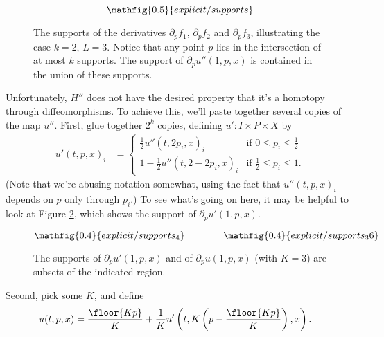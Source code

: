 \begin{figure}[!ht]
\begin{equation*}
\mathfig{0.5}{explicit/supports}
\end{equation*}
\caption{The supports of the derivatives {\color{green}$\partial_p f_1$}, {\color{blue}$\partial_p f_2$} and {\color{red}$\partial_p f_3$}, illustrating the case $k=2$, $L=3$. Notice that any
point $p$ lies in the intersection of at most $k$ supports. The support of $\partial_p u''(1,p,x)$ is contained in the union of these supports.}
\label{fig:supports}
\end{figure}

Unfortunately, $H''$ does not have the desired property that it's a homotopy through diffeomorphisms. To achieve this, we'll paste together several copies
of the map $u''$. First, glue together $2^k$ copies, defining $u':I \times P \times X$ by
\begin{align*}
u'(t,p,x)_i & =
\begin{cases}
\frac{1}{2} u''(t, 2p_i, x)_i & \text{if $0 \leq p_i \leq \frac{1}{2}$} \\
1-\frac{1}{2} u''(t, 2-2p_i, x)_i & \text{if $\frac{1}{2} \leq p_i \leq 1$}.
\end{cases}
\end{align*}
(Note that we're abusing notation somewhat, using the fact that $u''(t,p,x)_i$ depends on $p$ only through $p_i$.)
To see what's going on here, it may be helpful to look at Figure \ref{fig:supports_4}, which shows the support of $\partial_p u'(1,p,x)$.
\begin{figure}[!ht]
\begin{equation*}
\mathfig{0.4}{explicit/supports_4} \qquad \qquad \mathfig{0.4}{explicit/supports_36}
\end{equation*}
\caption{The supports of $\partial_p u'(1,p,x)$ and of $\partial_p u(1,p,x)$ (with $K=3$) are subsets of the indicated region.}
\label{fig:supports_4}
\end{figure}

Second, pick some $K$, and define
\begin{align*}
u(t,p,x) & = \frac{\floor{K p}}{K} + \frac{1}{K} u'\left(t, K \left(p - \frac{\floor{K p}}{K}\right), x\right).
\end{align*}


